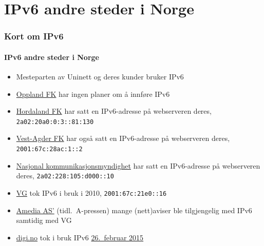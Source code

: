 \section{IPv6 andre steder i Norge}
\begin{frame}%
  \frametitle{Kort om IPv6}
  \framesubtitle{IPv6 andre steder i Norge}
  \pause
  \begin{itemize}[<+->]
  \item Mesteparten av Uninett og deres kunder bruker IPv6
  \item \href{http://www.oppland.no/}{Oppland FK} har ingen
    planer om å innføre IPv6
  \item \href{http://www.hordaland.no/}{Hordaland FK} har satt en
    IPv6-adresse på webserveren deres, \texttt{2a02:20a0:0:3::81:130}
  \item \href{http://www.vaf.no/}{Vest-Agder FK} har også satt en
    IPv6-adresse på webserveren deres, \texttt{2001:67c:28ac:1::2}
  \item \href{http://www.nkom.no/}{Nasjonal kommunikasjonsmyndighet}
    har satt en IPv6-adresse på webserveren deres,
    \texttt{2a02:228:105:d000::10}
  \item \href{http://vg.no/}{VG} tok IPv6 i bruk i 2010,
    \texttt{2001:67c:21e0::16}
  \item \href{http://www.amedia.no/}{Amedia AS'} (tidl.\ A-pressen) mange
    (nett)aviser ble tilgjengelig med IPv6 samtidig med VG
  \item \href{http://www.digi.no/}{digi.no} tok i bruk IPv6
    \href{https://twitter.com/digi_no/status/567348983237206016}{26.~februar
      2015}
  \end{itemize}
\end{frame}

